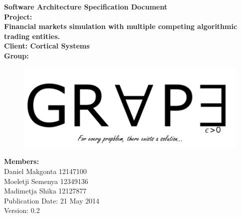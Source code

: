 \documentclass[12pt]{article}
\newcommand{\Title}{Software Architecture Specification Document} %
\begin{document}
	\begin{center}%
		\LARGE \bf \Title \\[2em]
		\Large {Project:}\\
		Financial markets simulation with multiple competing algorithmic trading entities.\\[0.7em]
		\Large {Client:}
		Cortical Systems\\[2em]
		\LARGE {\bf Group:}\\
			\begin{figure}[ht!]
				\centering
				\includegraphics[scale=0.4]{Logo8.png}
			\end{figure}
			
		\Large {\bf Members:}\\[0.3em]
		\large
		Daniel Makgonta 12147100\\
		Moeletji Semenya 12349136\\
		Madimetja Shika 12127877\\[3em]
	
	\small Publication Date: 21 May 2014\\[0.5em]
	\small Version: 0.2		    
	\end{center}%
	
\end{document}

